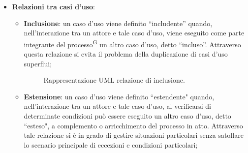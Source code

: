 \documentclass[8pt]{article}
\newcommand{\glossterm}[1]{#1\textsuperscript{G}} %
\begin{document}
\begin{itemize}
\begin{figure}[H]
        \end{figure}
    \item \textbf{Relazioni tra casi d'uso}: 
        \begin{itemize}
        \item \textbf{Inclusione}: un caso d'uso viene definito ``includente'' quando, nell'interazione tra un attore e tale caso d'uso, viene eseguito come parte integrante del \glossterm{processo} un altro caso d'uso, detto ``incluso''. Attraverso questa relazione si evita il problema della duplicazione di casi d'uso superflui; 
            \begin{figure}[H]
                \centering
                \caption{Rappresentazione UML relazione di inclusione.}
                \label{fig:Rappresentazione UML relazione di inclusione}
            \end{figure}
        \item \textbf{Estensione}: un caso d'uso viene definito ``estendente" quando,
            nell'interazione tra un attore e tale caso d'uso, al verificarsi di determinate
                condizioni può essere eseguito un altro caso d'uso, detto ``esteso", a complemento o arricchimento del processo in atto. Attraverso tale relazione si è in grado di gestire situazioni particolari senza satollare lo scenario principale di eccezioni e condizioni particolari;
            \begin{figure}[H]
                \centering
\end{figure}
\end{itemize}
\end{itemize}
\end{document}
